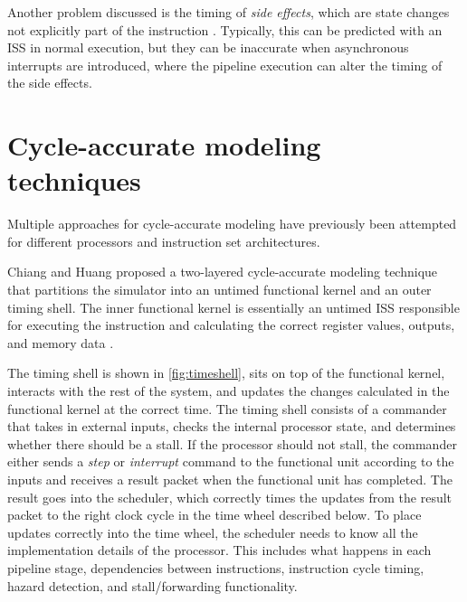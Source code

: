 Another problem discussed is the timing of \textit{side effects}, which are state changes not explicitly part of the instruction \cite{taylorAdvancedRISCVVerification2023}. Typically, this can be predicted with an ISS in normal execution, but they can be inaccurate when asynchronous interrupts are introduced, where the pipeline execution can alter the timing of the side effects.




\section{Cycle-accurate modeling techniques}
\label{sec:bg_cycle-accurate}

Multiple approaches for cycle-accurate modeling have previously been attempted for different processors and instruction set architectures.

Chiang and Huang proposed a two-layered cycle-accurate modeling technique that partitions the simulator into an untimed functional kernel and an outer timing shell. The inner functional kernel is essentially an untimed ISS responsible for executing the instruction and calculating the correct register values, outputs, and memory data \cite{chiangEfficientTwolayeredCycleaccurate2009}.

The timing shell is shown in \cref{fig:timeshell}, sits on top of the functional kernel, interacts with the rest of the system, and updates the changes calculated in the functional kernel at the correct time. The timing shell consists of a commander that takes in external inputs, checks the internal processor state, and determines whether there should be a stall. If the processor should not stall, the commander either sends a \textit{step} or \textit{interrupt} command to the functional unit according to the inputs and receives a result packet when the functional unit has completed. The result goes into the scheduler, which correctly times the updates from the result packet to the right clock cycle in the time wheel described below. To place updates correctly into the time wheel, the scheduler needs to know all the implementation details of the processor. This includes what happens in each pipeline stage, dependencies between instructions, instruction cycle timing, hazard detection, and stall/forwarding functionality. \cite{chiangEfficientTwolayeredCycleaccurate2009}


